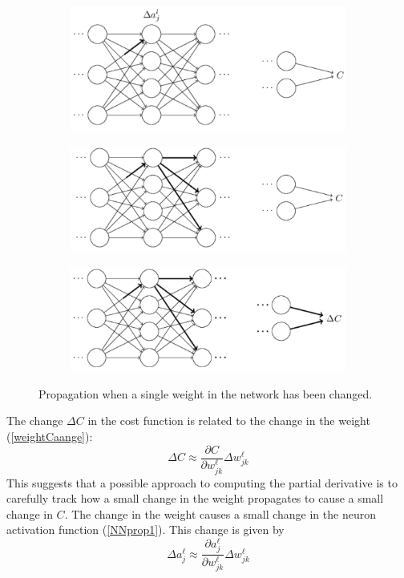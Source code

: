 \begin{figure}
\centering
\begin{subfigure}{0.9\textwidth}
\centering
\includegraphics[width=0.8\linewidth]{img/NNprop1}
\caption{}
\label{NNprop1}
\end{subfigure}
\begin{subfigure}{0.9\textwidth}
\centering
\includegraphics[width=0.8\linewidth]{img/NNprop2}
\caption{}
\label{NNprop2}
\end{subfigure}
\begin{subfigure}{0.9\textwidth}
\centering
\includegraphics[width=0.8\linewidth]{img/NNprop3}
\caption{}
\label{NNprop3}
\end{subfigure}
\caption{Propagation when a single weight in the network has been changed.}
\label{weightCaange}
\end{figure}
The change $\Delta C$ in the cost function is related to the change in the weight (\autoref{weightCaange}):
\begin{equation}
\Delta C \approx \frac{\partial C}{\partial w_{jk}^\ell} \Delta w_{jk}^\ell
\label{DeltaC}
\end{equation}
This suggests that a possible approach to computing the partial derivative is to carefully track how a small change in the weight propagates to cause a small change in $C$. The change in the weight causes a small change in the neuron activation function (\autoref{NNprop1}). This change is given by
\begin{equation}
\Delta a_j^\ell \approx \frac{\partial a_j^\ell}{\partial w_{jk}^\ell}\Delta w_{jk}^\ell
\end{equation}

